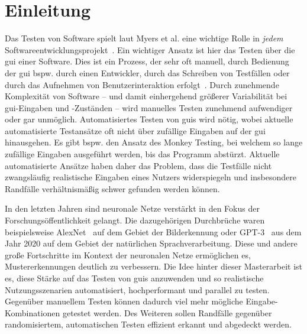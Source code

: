 \chapter{Einleitung}


Das Testen von Software spielt laut Myers et al. eine wichtige Rolle in \emph{jedem} Softwareentwicklungsprojekt~\cite[S. ix]{myersArtSoftwareTesting2011}. Ein wichtiger Ansatz ist hier das Testen über die \gls{gui} einer Software. Dies ist ein Prozess, der sehr oft manuell, \dh durch Bedienung der \gls{gui} bspw. durch einen Entwickler, durch das Schreiben von Testfällen oder durch das Aufnehmen von Benutzerinteraktion erfolgt~\cite[66-67]{nguyenGUITARInnovativeTool2014}. Durch zunehmende Komplexität von Software -- und damit einhergehend größerer Variabilität bei \gls{gui}-Eingaben und -Zuständen -- wird manuelles Testen zunehmend aufwendiger oder gar unmöglich. Automatisiertes Testen von \glspl{gui} wird nötig, wobei aktuelle automatisierte Testansätze oft nicht über zufällige Eingaben auf der \gls{gui} hinausgehen. Es gibt bspw. den Ansatz des Monkey Testing, bei welchem so lange zufällige Eingaben ausgeführt werden, bis das Programm abstürzt. Aktuelle automatisierte Ansätze haben daher das Problem, dass die Testfälle nicht zwangsläufig realistische Eingaben eines Nutzers widerspiegeln und insbesondere Randfälle verhältnismäßig schwer gefunden werden können.

In den letzten Jahren sind neuronale Netze verstärkt in den Fokus der Forschungsöffentlichkeit gelangt. Die dazugehörigen Durchbrüche waren beispielsweise AlexNet~\cite{krizhevskyImageNetClassificationDeep2012} auf dem Gebiet der Bilderkennung oder GPT-3~\cite{brownLanguageModelsAre2020} aus dem Jahr 2020 auf dem Gebiet der natürlichen Sprachverarbeitung. Diese und andere große Fortschritte im Kontext der neuronalen Netze ermöglichen es, Mustererkennungen deutlich zu verbessern.
Die Idee hinter dieser Masterarbeit ist es, diese Stärke auf das Testen von \glspl{gui} anzuwenden und so realistische Nutzungsszenarien automatisiert, hochperformant und parallel zu testen. Gegenüber manuellem Testen können dadurch viel mehr mögliche Eingabe-Kombinationen getestet werden. Des Weiteren sollen Randfälle gegenüber randomisiertem, automatischen Testen effizient erkannt und abgedeckt werden.

